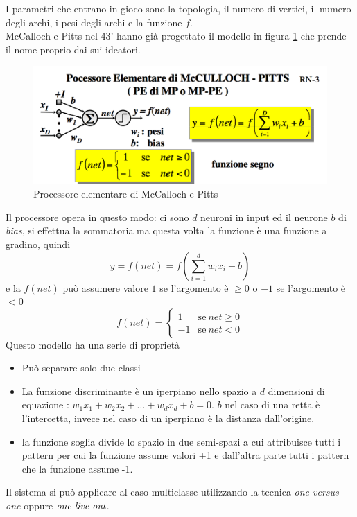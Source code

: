 \noindent I parametri che entrano in gioco sono la topologia, il numero di vertici, il numero degli archi, i pesi degli archi e la funzione $f$.\\

\noindent McCalloch e Pitts nel 43' hanno già progettato il modello in figura \ref{pemc} che prende il nome proprio dai sui ideatori.
\begin{figure}
\centering
\includegraphics[scale=0.4]{img/PEMC.png}
\caption{Processore elementare di McCalloch e Pitts }
\label{pemc}
\end{figure}
Il processore opera in questo modo:  ci sono $d$ neuroni in input ed il neurone $b$ di \emph{bias}, si effettua la sommatoria ma questa volta la funzione è una funzione a gradino, quindi 
\begin{equation}
y=f(net) = f \left( \sum_{i=1}^d w_i x_i +b\right)
\end{equation}
e la $f(net)$ può assumere valore $1$ se l'argomento è $\geq 0$ o $-1$ se l'argomento è $< 0$
\[
f(net)=
\begin{cases}
1 & \text{se} \ net \geq 0\\
-1 & \text{se} \ net < 0 
\end{cases} 
\]
\noindent Questo modello ha una serie di proprietà
\begin{itemize}
\item Può separare solo due classi
\item La funzione discriminante è un iperpiano nello spazio a $d$ dimensioni di equazione : $w_1 x_1 + w_2 x_2 + \dots + w_d x_d + b = 0$. $b$  nel caso di una retta è l'intercetta, invece nel caso di un iperpiano è la distanza dall'origine.
\item la funzione soglia divide lo spazio in due semi-spazi a cui attribuisce tutti i pattern per cui la funzione assume valori +1 e dall'altra parte tutti i pattern che la funzione assume  -1.
\end{itemize}
Il sistema si può applicare al caso multiclasse utilizzando la tecnica \emph{one-versus-one} oppure $\emph{one-live-out}$.\\

